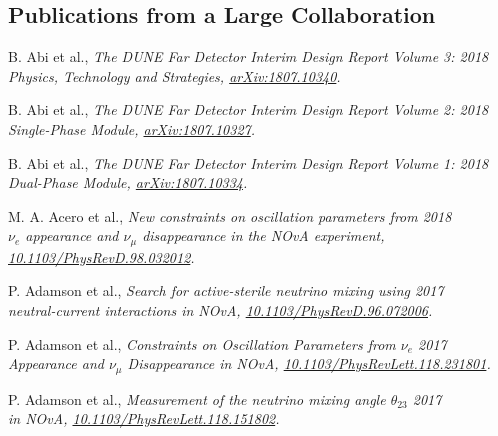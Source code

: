 \documentclass[11pt]{cv}
\begin{document}
\begin{cv}
\section{Publications from a Large Collaboration}
\begin{etaremune}
  \item B. Abi et al., \it The DUNE Far Detector Interim Design Report Volume 3: \rm \hfill 2018 \\
  \it Physics, Technology and Strategies, \rm \href{https://arxiv.org/abs/1807.10340}{arXiv:1807.10340}.
  \item B. Abi et al., \it The DUNE Far Detector Interim Design Report Volume 2: \rm \hfill 2018 \\
  \it Single-Phase Module, \rm \href{https://arxiv.org/abs/1807.10327}{arXiv:1807.10327}.
  \item B. Abi et al., \it The DUNE Far Detector Interim Design Report Volume 1: \rm \hfill 2018 \\
  \it Dual-Phase Module, \rm \href{https://arxiv.org/abs/1807.10334}{arXiv:1807.10334}.
  \item M. A. Acero et al., \it New constraints on oscillation parameters from \rm \hfill 2018 \\
  \it $\nu_e$ appearance and $\nu_\mu$ disappearance in the NOvA experiment, \rm \\
  \href{https://doi.org/10.1103/PhysRevD.98.032012}{10.1103/PhysRevD.98.032012}.
  \item P. Adamson et al., \it Search for active-sterile neutrino mixing using \rm \hfill 2017 \\
  \it neutral-current interactions in NOvA, \rm \href{https://doi.org/10.1103/PhysRevD.96.072006}{10.1103/PhysRevD.96.072006}.
  \item P. Adamson et al., \it Constraints on Oscillation Parameters from $\nu_e$ \rm \hfill 2017 \\
  \it  Appearance and $\nu_\mu$ Disappearance in NOvA, \rm \href{https://doi.org/10.1103/PhysRevLett.118.231801}{10.1103/PhysRevLett.118.231801}.
  \item P. Adamson et al., \it Measurement of the neutrino mixing angle $\theta_{23}$ \rm \hfill 2017 \\
  \it in NOvA, \rm \href{https://doi.org/10.1103/PhysRevLett.118.151802}{10.1103/PhysRevLett.118.151802}.
\end{etaremune}



\end{cv}
\end{document}
